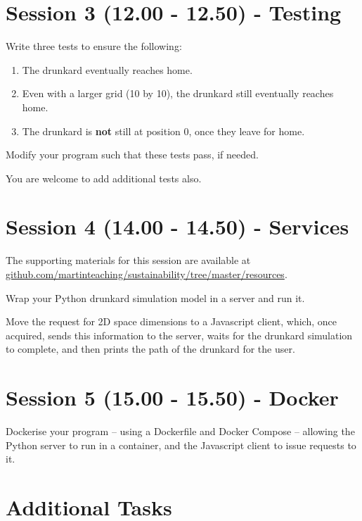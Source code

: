 \documentclass{article}
\begin{document}
\section{Session 3 (12.00 - 12.50) - Testing}

Write three tests to ensure the following:

\begin{enumerate}

    \item The drunkard eventually reaches home.

    \item Even with a larger grid (10 by 10), the drunkard still eventually reaches home.

    \item The drunkard is \textbf{not} still at position 0, once they leave for home.

\end{enumerate}

Modify your program such that these tests pass, if needed.

You are welcome to add additional tests also.

\section{Session 4 (14.00 - 14.50) - Services}

The supporting materials for this session are available at \newline
\href{https://github.com/martinteaching/sustainability/tree/master/resources}{github.com/martinteaching/sustainability/tree/master/resources}.

Wrap your Python drunkard simulation model in a server and run it.

Move the request for 2D space dimensions to a Javascript client, which, once acquired, sends this information to the server, waits for the drunkard simulation to complete, and then prints the path of the drunkard for the user.

\section{Session 5 (15.00 - 15.50) - Docker}

Dockerise your program -- using a Dockerfile and Docker Compose -- allowing the Python server to run in a container, and the Javascript client to issue requests to it.

\section{Additional Tasks}
\end{document}

